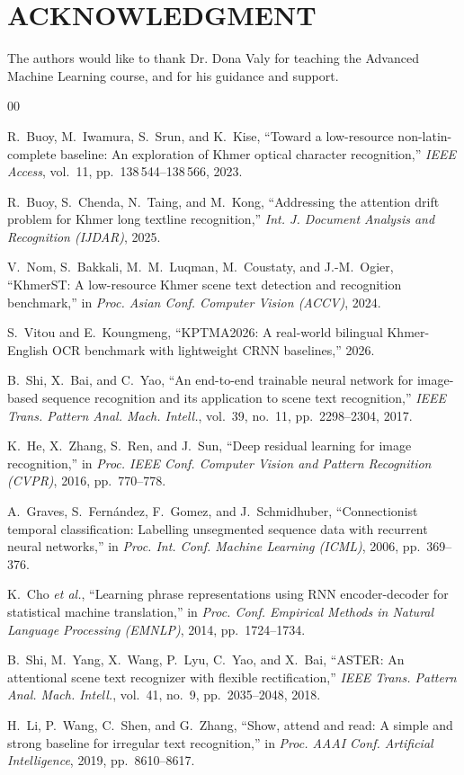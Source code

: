 \documentclass[conference]{IEEEtran}
\begin{document}
\section*{ACKNOWLEDGMENT}
The authors would like to thank Dr. Dona Valy for teaching the Advanced Machine Learning course, and for his guidance and support.

\begin{thebibliography}{00}

R.~Buoy, M.~Iwamura, S.~Srun, and K.~Kise,
``Toward a low-resource non-latin-complete baseline: An exploration of Khmer
optical character recognition,'' \textit{IEEE Access}, vol.~11,
pp.~138\,544--138\,566, 2023.

R.~Buoy, S.~Chenda, N.~Taing, and M.~Kong,
``Addressing the attention drift problem for Khmer long textline recognition,''
\textit{Int. J. Document Analysis and Recognition (IJDAR)}, 2025.

V.~Nom, S.~Bakkali, M.~M.~Luqman, M.~Coustaty, and J.-M.~Ogier,
``KhmerST: A low-resource Khmer scene text detection and recognition benchmark,''
in \textit{Proc. Asian Conf. Computer Vision (ACCV)}, 2024.

S.~Vitou and E.~Koungmeng,
``KPTMA2026: A real-world bilingual Khmer-English OCR benchmark with lightweight
CRNN baselines,'' 2026.

B.~Shi, X.~Bai, and C.~Yao,
``An end-to-end trainable neural network for image-based sequence recognition
and its application to scene text recognition,'' \textit{IEEE Trans. Pattern
Anal. Mach. Intell.}, vol.~39, no.~11, pp.~2298--2304, 2017.

K.~He, X.~Zhang, S.~Ren, and J.~Sun,
``Deep residual learning for image recognition,'' in \textit{Proc. IEEE Conf.
Computer Vision and Pattern Recognition (CVPR)}, 2016, pp.~770--778.

A.~Graves, S.~Fern\'{a}ndez, F.~Gomez, and J.~Schmidhuber,
``Connectionist temporal classification: Labelling unsegmented sequence data
with recurrent neural networks,'' in \textit{Proc. Int. Conf. Machine Learning
(ICML)}, 2006, pp.~369--376.

K.~Cho \emph{et al.},
``Learning phrase representations using RNN encoder-decoder for statistical
machine translation,'' in \textit{Proc. Conf. Empirical Methods in Natural
Language Processing (EMNLP)}, 2014, pp.~1724--1734.

B.~Shi, M.~Yang, X.~Wang, P.~Lyu, C.~Yao, and X.~Bai,
``ASTER: An attentional scene text recognizer with flexible rectification,''
\textit{IEEE Trans. Pattern Anal. Mach. Intell.}, vol.~41, no.~9,
pp.~2035--2048, 2018.

H.~Li, P.~Wang, C.~Shen, and G.~Zhang,
``Show, attend and read: A simple and strong baseline for irregular text
recognition,'' in \textit{Proc. AAAI Conf. Artificial Intelligence}, 2019,
pp.~8610--8617.

\end{thebibliography}
\end{document}
